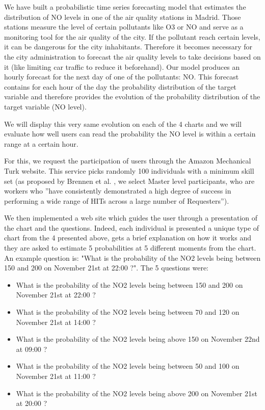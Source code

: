 \documentclass[a4paper,3p,sort&compress]{elsarticle}
\begin{document}
We have built a probabilistic time series forecasting model that estimates the distribution of NO 
levels in one of the air quality stations in Madrid. Those stations measure the level of certain 
pollutants like O3 or NO and serve as a monitoring tool for the air quality of the city. If the pollutant 
reach certain levels, it can be dangerous for the city inhabitants. Therefore it becomes necessary 
for the city administration to 
forecast the air quality levels to take decisions based on it (like limiting car traffic to reduce it beforehand).
Our model produces an hourly forecast for the next day of one of the pollutants: NO. This forecast contains
for each hour of the day the probability distribution of the target variable and therefore provides the evolution 
of the probability distribution of the target variable (NO level).

We will display this very same evolution on each of the 4 charts and we will evaluate how well users can 
read the probability the NO level is within a certain range at a certain hour. 

For this, we request the participation of users through the Amazon Mechanical Turk website. 
This service picks randomly 100 individuals with a minimum skill set (as proposed by Brennen 
et al. \cite{brennen_instrument_2018}, we select Master level participants, who are workers who 
''have consistently demonstrated a high degree of success in performing a wide range of HITs across a 
large number of Requesters'').

We then implemented a web site which guides the user through a presentation of the chart and the questions.
Indeed,  each individual is presented a unique type of chart from the 4 presented above, gets a brief 
explanation on how it works and they are asked to estimate 5 probabilities at 5 different moments from the chart. 
An example question is: 
"What is the probability of the NO2 levels being between 150 and 200 on 
November 21st at 22:00 ?". The 5 questions were:
\begin{itemize}
  \item What is the probability of the NO2 levels being between 150 and 200 on November 21st at 22:00 ?
  \item What is the probability of the NO2 levels being between 70 and 120 on November 21st at 14:00 ?
  \item What is the probability of the NO2 levels being above 150 on November 22nd at 09:00 ?
  \item What is the probability of the NO2 levels being between 50 and 100 on November 21st at 11:00 ?
  \item What is the probability of the NO2 levels being above 200 on November 21st at 20:00 ?
\end{itemize}
\end{document}
